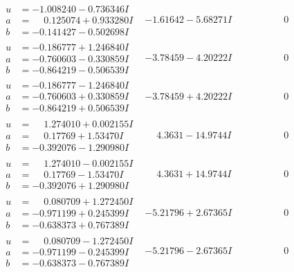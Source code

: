 \documentclass[1p]{elsarticle_modified}
\theoremstyle{definition}
\begin{document}
$$\begin{array}{c|c|c}
\begin{aligned}
u &= -1.008240 - 0.736346 I \\
a &= \phantom{-}0.125074 + 0.933280 I \\
b &= -0.141427 - 0.502698 I\end{aligned}
 & -1.61642 - 5.68271 I & \phantom{-0.000000 } 0 \\ \hline\begin{aligned}
u &= -0.186777 + 1.246840 I \\
a &= -0.760603 - 0.330859 I \\
b &= -0.864219 - 0.506539 I\end{aligned}
 & -3.78459 - 4.20222 I & \phantom{-0.000000 } 0 \\ \hline\begin{aligned}
u &= -0.186777 - 1.246840 I \\
a &= -0.760603 + 0.330859 I \\
b &= -0.864219 + 0.506539 I\end{aligned}
 & -3.78459 + 4.20222 I & \phantom{-0.000000 } 0 \\ \hline\begin{aligned}
u &= \phantom{-}1.274010 + 0.002155 I \\
a &= \phantom{-}0.17769 + 1.53470 I \\
b &= -0.392076 - 1.290980 I\end{aligned}
 & \phantom{-}4.3631 - 14.9744 I & \phantom{-0.000000 } 0 \\ \hline\begin{aligned}
u &= \phantom{-}1.274010 - 0.002155 I \\
a &= \phantom{-}0.17769 - 1.53470 I \\
b &= -0.392076 + 1.290980 I\end{aligned}
 & \phantom{-}4.3631 + 14.9744 I & \phantom{-0.000000 } 0 \\ \hline\begin{aligned}
u &= \phantom{-}0.080709 + 1.272450 I \\
a &= -0.971199 + 0.245399 I \\
b &= -0.638373 + 0.767389 I\end{aligned}
 & -5.21796 + 2.67365 I & \phantom{-0.000000 } 0 \\ \hline\begin{aligned}
u &= \phantom{-}0.080709 - 1.272450 I \\
a &= -0.971199 - 0.245399 I \\
b &= -0.638373 - 0.767389 I\end{aligned}
 & -5.21796 - 2.67365 I & \phantom{-0.000000 } 0\\

\end{array}$$
\end{document}
